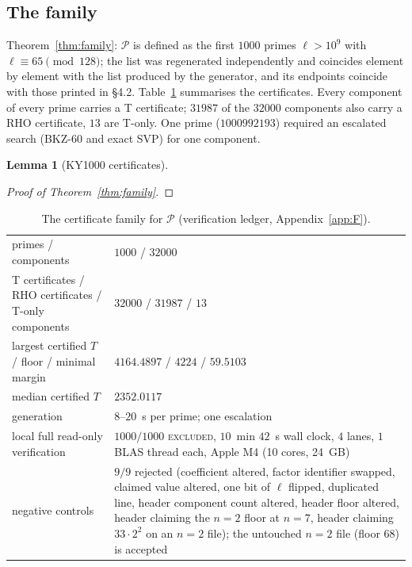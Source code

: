 \documentclass[11pt]{amsart}
\newtheorem{lemma}[theorem]{Lemma}
\theoremstyle{remark}\newtheorem{remark}[theorem]{Remark}
\theoremstyle{definition}\newtheorem{definition}[theorem]{Definition}
\theoremstyle{definition}\newtheorem{algorithm}[theorem]{Algorithm}
\providecommand{\proofsdir}{../../proofs} %
\begin{document}
\subsection{The family}\label{sec:family}
Theorem~\ref{thm:family}: $\mathcal P$ is defined as the first $1000$ primes $\ell>10^9$ with $\ell\equiv65\pmod{128}$; the list was regenerated independently and coincides element by element with the list produced by the generator, and its endpoints coincide with those printed in \cite{KY} \S4.2. Table~\ref{tab:family} summarises the certificates. Every component of every prime carries a T certificate; $31987$ of the $32000$ components also carry a RHO certificate, $13$ are T-only. One prime ($1000992193$) required an escalated search (BKZ-$60$ and exact SVP) for one component.
\begin{lemma}[KY1000 certificates]\label{lem:ky1000}

\end{lemma}
\begin{proof}[Proof of Theorem~\ref{thm:family}]

\end{proof}
\begin{table}[h]\small
\begin{tabular}{@{}p{4.2cm}p{8.0cm}@{}}\toprule
primes / components & $1000$ / $32000$\\
T certificates / RHO certificates / T-only components & $32000$ / $31987$ / $13$\\
largest certified $T$ / floor / minimal margin & $4164.4897$ / $4224$ / $59.5103$\\
median certified $T$ & $2352.0117$\\
generation & $8$--$20$~s per prime; one escalation\\
local full read-only verification & $1000/1000$ \textsc{excluded}, $10$~min $42$~s wall clock, $4$ lanes, $1$ BLAS thread each, Apple M4 (10 cores, 24~GB)\\
negative controls & $9/9$ rejected (coefficient altered, factor identifier swapped, claimed value altered, one bit of $\ell$ flipped, duplicated line, header component count altered, header floor altered, header claiming the $n=2$ floor at $n=7$, header claiming $33\cdot2^2$ on an $n=2$ file); the untouched $n=2$ file (floor $68$) is accepted\\
\bottomrule\end{tabular}
\caption{The certificate family for $\mathcal P$ (verification ledger, Appendix~\ref{app:F}).}\label{tab:family}
\end{table}
\end{document}
